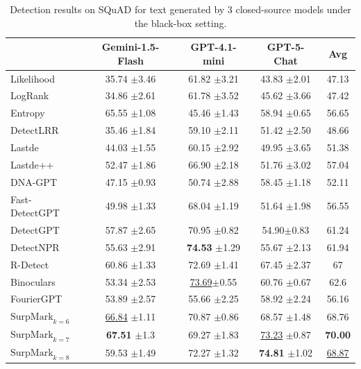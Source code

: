 \documentclass{article}
\newcommand{\com}[1]{\tiny$\pm$#1}
\theoremstyle{plain}
\theoremstyle{definition}
\theoremstyle{remark}
\begin{document}
\begin{table}[htbp]
\centering
{\scriptsize

\begin{tabular}{lcccc}
\toprule
& Gemini-1.5-Flash & GPT-4.1-mini & GPT-5-Chat & Avg  \\
\midrule
Likelihood & 35.74 \com 3.46 & 61.82 \com 3.21 & 43.83 \com 2.01  & 47.13 \\

LogRank & 34.86 \com 2.61 & 61.78 \com 3.52 & 45.62 \com 3.66 & 47.42 \\

Entropy & 65.55 \com 1.08 & 45.46 \com 1.43 & 58.94 \com 0.65 & 56.65 \\

DetectLRR & 35.46 \com 1.84 & 59.10 \com 2.11 & 51.42 \com 2.50 & 48.66 \\

Lastde & 44.03 \com 1.55 & 60.15 \com 2.92 & 49.95 \com 3.65  & 51.38 \\

Lastde++ & 52.47 \com 1.86& 66.90 \com 2.18 & 51.76 \com 3.02 & 57.04 \\

DNA-GPT & 47.15 \com 0.93 & 50.74 \com 2.88 & 58.45 \com 1.18 & 52.11 \\

Fast-DetectGPT & 49.98 \com 1.33 & 68.04 \com 1.19 & 51.64 \com 1.98 & 56.55 \\

DetectGPT &57.87 \com 2.65 & {70.95} \com 0.82 & 54.90\com 0.83 & 61.24 \\

DetectNPR & 55.63 \com 2.91& \textbf{74.53} \com 1.29 & 55.67 \com 2.13 & 61.94 \\

R-Detect & 60.86 \com 1.33& {72.69} \com 1.41 & 67.45 \com 2.37 & 67 \\

Binoculars &  53.34 \com 2.53 & \underline{73.69}\com 0.55 & 60.76 \com 0.67 & 62.6 \\

FourierGPT &   53.89 \com 2.57 &  55.66 \com 2.25 & 58.92 \com 2.24 & 56.16\\

\rowcolor{ours}$\text{SurpMark}_{k=6}$ & \underline{66.84} \com 1.11 & 70.87 \com 0.86 & 68.57 \com 1.48& 68.76 \\

\rowcolor{ours}$\text{SurpMark}_{k=7}$ & \textbf{67.51} \com 1.3 & 69.27 \com 1.83 & \underline{73.23} \com 0.87 & \textbf{70.00} \\

\rowcolor{ours}$\text{SurpMark}_{k=8}$ & 59.53 \com 1.49 & 72.27 \com 1.32 & \textbf{74.81} \com 1.02 & \underline{68.87} \\
\bottomrule
\end{tabular}}
\caption{Detection results on SQuAD for text generated by 3 closed-source models under the black-box setting. }
\label{tab:closesource-squad}
\end{table}
\end{document}

